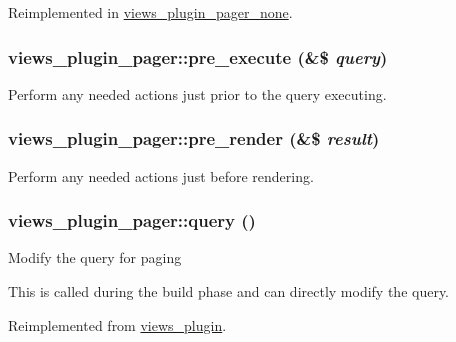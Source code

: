 Reimplemented in \hyperlink{classviews__plugin__pager__none_a6edc35744edc03c632d74267a4d33ad3}{views\_\-plugin\_\-pager\_\-none}.\hypertarget{classviews__plugin__pager_a45d3511ab5324a0432cea29f8b4641de}{
\subsubsection[{pre\_\-execute}]{\setlength{\rightskip}{0pt plus 5cm}views\_\-plugin\_\-pager::pre\_\-execute (\&\$ {\em query})}}
\label{classviews__plugin__pager_a45d3511ab5324a0432cea29f8b4641de}
Perform any needed actions just prior to the query executing. \hypertarget{classviews__plugin__pager_a0601e340779ba6846e6fb54cd1d2cd62}{
\subsubsection[{pre\_\-render}]{\setlength{\rightskip}{0pt plus 5cm}views\_\-plugin\_\-pager::pre\_\-render (\&\$ {\em result})}}
\label{classviews__plugin__pager_a0601e340779ba6846e6fb54cd1d2cd62}
Perform any needed actions just before rendering. \hypertarget{classviews__plugin__pager_a6b9aad7e28125013cbf7a15c19e78d47}{
\subsubsection[{query}]{\setlength{\rightskip}{0pt plus 5cm}views\_\-plugin\_\-pager::query ()}}
\label{classviews__plugin__pager_a6b9aad7e28125013cbf7a15c19e78d47}
Modify the query for paging

This is called during the build phase and can directly modify the query. 

Reimplemented from \hyperlink{classviews__plugin_a10ac07c47c4a8735786f9fcc38548587}{views\_\-plugin}.


